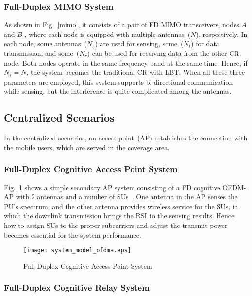 \documentclass[onecolumn,12pt]{IEEEtran}
\begin{document}
\subsubsection{Full-Duplex MIMO System}
 As shown in Fig.~\ref{mimo}, it consists of a pair of FD MIMO transceivers, nodes $A$ and $B$ , where each node is equipped with multiple antennas~($N$), respectively. In each node, some antennas~($N_s$) are used for sensing, some~($N_t$) for data transmission, and some~($N_r$) can be used for receiving data from the other CR node. Both nodes operate in the same frequency band at the same time. Hence, if $N_s = N$, the system becomes the traditional CR with LBT; When all these three parameters are employed, this system supports bi-directional communication while sensing, but the interference is quite complicated among the antennas.



\subsection{Centralized Scenarios}
In the centralized scenarios, an access point~(AP) establishes the connection with the mobile users, which are served in the coverage area.
\subsubsection{Full-Duplex Cognitive Access Point System}



Fig.~\ref{ofdma} shows a simple secondary AP system consisting of a FD cognitive OFDM-AP with 2 antennas and a number of SUs~\cite{Wang2015icc}. One antenna in the AP senses the PU's spectrum, and the other antenna provides wireless service for the SUs, in which the downlink transmission brings the RSI to the sensing results. Hence, how to assign SUs to the proper subcarriers and adjust the transmit power becomes essential for the system performance.

\begin{figure}[ht]
\begin{center}
\centerline{\texttt{[image: system\_model\_ofdma.eps]}}
\caption{Full-Duplex Cognitive Access Point System} \label{ofdma}
\end{center}
\end{figure}

\subsubsection{Full-Duplex Cognitive Relay System}
\end{document}

